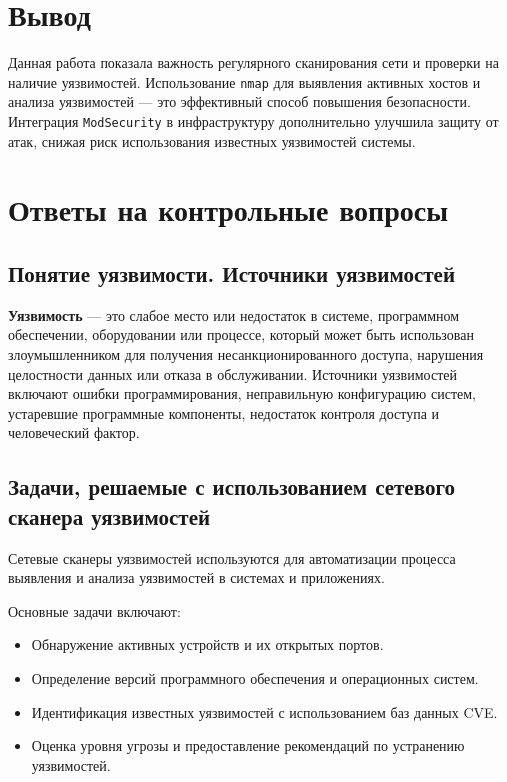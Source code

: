 \clearpage

\section*{Вывод}

Данная работа показала важность регулярного сканирования сети
и проверки на наличие уязвимостей.
Использование \texttt{nmap} для выявления активных хостов
и анализа уязвимостей --- это эффективный способ повышения безопасности.
Интеграция \texttt{ModSecurity}
в инфраструктуру дополнительно улучшила защиту от атак,
снижая риск использования известных уязвимостей системы.

\clearpage

\section*{Ответы на контрольные вопросы}

\subsection*{Понятие уязвимости. Источники уязвимостей}

\textbf{Уязвимость} --- это слабое место или недостаток в системе,
программном обеспечении, оборудовании или процессе,
который может быть использован злоумышленником
для получения несанкционированного доступа,
нарушения целостности данных или отказа в обслуживании.
Источники уязвимостей включают ошибки программирования,
неправильную конфигурацию систем, устаревшие программные компоненты,
недостаток контроля доступа и человеческий фактор.

\subsection*{Задачи, решаемые с использованием сетевого сканера уязвимостей}

Сетевые сканеры уязвимостей используются для автоматизации процесса выявления
и анализа уязвимостей в системах и приложениях.

Основные задачи включают:

\begin{itemize}
	\item Обнаружение активных устройств и их открытых портов.
	\item Определение версий программного обеспечения
		и операционных систем.
	\item Идентификация известных уязвимостей
		с использованием баз данных CVE.
	\item Оценка уровня угрозы
		и предоставление рекомендаций по устранению уязвимостей.
\end{itemize}

